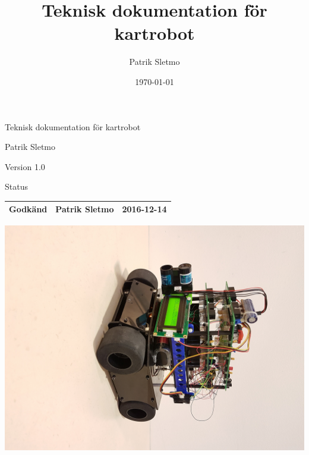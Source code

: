 \documentclass{article}
\title{Teknisk dokumentation för kartrobot}
\author{Patrik Sletmo}
\date{\today}
\begin{document}
\thispagestyle{empty}

{
\sffamily
\centering
\large


{\huge 
Teknisk dokumentation för kartrobot
}

{\large
Patrik Sletmo
}

{\large
Version 1.0
}

\vspace{3.5cm}

Status
\begin{table}[H]
\centering
\begin{tabular}{ | c | c | c | }
\hline
Godkänd & Patrik Sletmo & 2016-12-14 \\
\hline
\end{tabular}
\end{table}


\begin{center}
\includegraphics[scale=0.065]{robot_cover_photo}
\end{center}
}

\clearpage
\end{document}
